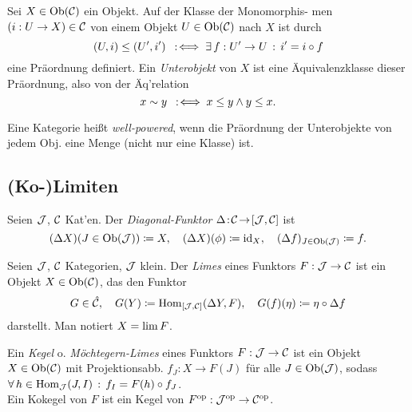 \documentclass{cheat-sheet}
\begin{document}
\begin{samepage}

\begin{defn}
  Sei $X \in \operatorname{Ob}(\mathcal{C})$ ein Objekt. Auf der Klasse der Monomorphis- men $(i : U \to X) \in \mathcal{C}$ von einem Objekt $U \in \operatorname{Ob}(\mathcal{C})$ nach $X$ ist durch
  \[ (U, i) \leq (U', i') \enspace:\!\iff \exists \, {f : U' \to U} \,:\, i' = i \circ f \]
  eine Präordnung definiert. Ein \emph{Unterobjekt} von $X$ ist eine Äquivalenzklasse dieser Präordnung, also von der Äq'relation
  \[ x \sim y \enspace:\!\iff x \leq y \wedge y \leq x. \]
\end{defn}

\begin{defn}
  Eine Kategorie heißt \emph{well-powered}, wenn die Präordnung der Unterobjekte von jedem Obj. eine Menge (nicht nur eine Klasse) ist.
\end{defn}


\begin{samepage}
  \subsection{(Ko-)Limiten}
\end{samepage}


\begin{defn}
  Seien $\mathcal{J}$, $\mathcal{C}$ Kat'en.
  Der \emph{Diagonal-Funktor} $\Delta \!:\! \mathcal{C} \!\to\! [\mathcal{J}, \mathcal{C}]$ ist
  \[
    (\Delta X)(J \in \operatorname{Ob}(\mathcal{J})) \coloneqq X, \quad
    (\Delta X)(\phi) \coloneqq \operatorname{id}_X, \quad
    (\Delta f)_{J \in \operatorname{Ob}(\mathcal{J})} \coloneqq f.
  \]
\end{defn}

\begin{defn}
  Seien $\mathcal{J}$, $\mathcal{C}$ Kategorien, $\mathcal{J}$ klein. Der \emph{Limes} eines Funktors $F : \mathcal{J} \to \mathcal{C}$ ist ein Objekt $X \in \operatorname{Ob}(\mathcal{C})$, das den Funktor
  \[
    G \in \hat{\mathcal{C}}, \quad
    G(Y) \coloneqq \operatorname{Hom}_{[\mathcal{J}, \mathcal{C}]}(\Delta Y, F), \quad
    G(f)(\eta) \coloneqq \eta \circ \Delta f
  \]
  darstellt. Man notiert $X = \lim F$.
\end{defn}


\begin{defn}
  Ein \emph{Kegel} o. \emph{Möchtegern-Limes} eines Funktors $F : \mathcal{J} \to \mathcal{C}$
  ist ein Objekt $X \in \operatorname{Ob}(\mathcal{C})$ mit Projektionsabb. $f_J : X \to F(J)$
  für alle $J \in \operatorname{Ob}(\mathcal{J})$, sodass
  $\forall \, {h \in \operatorname{Hom}_{\mathcal{J}}(J, I)} \,:\, f_I = F(h) \circ f_J$. \\
  Ein Kokegel von $F$ ist ein Kegel von $F^{\mathrm{op}} : \mathcal{J}^{\mathrm{op}} \to \mathcal{C}^{\mathrm{op}}$.
\end{defn}


\end{samepage}
\end{document}
